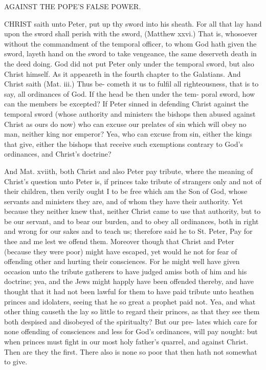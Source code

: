 \documentclass{custom}
\begin{document}
AGAINST THE POPE'S FALSE POWER. 

CHRIST saith unto Peter, put up thy sword into his sheath. 
For all that lay hand upon the sword shall perish with 
the sword, (Matthew xxvi.) That is, whosoever without the 
commandment of the temporal officer, to whom God hath 
given the sword, layeth hand on the sword to take vengeance,
the same deserveth death in the deed doing. God did 
not put Peter only under the temporal sword, but also
Christ himself. As it appeareth in the fourth chapter to
the Galatians. And Christ saith (Mat. iii.) Thus be-
cometh it us to fulfil all righteousness, that is to say, all 
ordinances of God. If the head be then under the tem- 
poral sword, how can the members be excepted? If 
Peter sinned in defending Christ against the temporal 
sword (whose authority and ministers the bishops then 
abused against Christ as ours do now) who can excuse our 
prelates of sin which will obey no man, neither king nor 
emperor? Yea, who can excuse from sin, either the kings 
that give, either the bishops that receive such exemptions 
contrary to God's ordinances, and Christ's doctrine? 

And Mat. xviith, both Christ and also Peter pay tribute, 
where the meaning of Christ's question unto Peter is, if 
princes take tribute of strangers only and not of their 
children, then verily ought I to be free which am the Son 
of God, whose servants and ministers they are, and of 
whom they have their authority. Yet because they neither 
knew that, neither Christ came to use that authority, but 
to be our servant, and to bear our burden, and to obey all 
ordinances, both in right and wrong for our sakes and to 
teach us; therefore said he to St. Peter, Pay for thee and 
me lest we offend them. Moreover though that Christ 
and Peter (because they were poor) might have escaped, 
yet would he not for fear of offending other and hurting 
their consciences. For he might well have given occasion 
unto the tribute gatherers to have judged amiss both of 
him and his doctrine; yea, and the Jews might happly 
have been offended thereby, and have thought that it had 
not been lawful for them to have paid tribute unto heathen 
princes and idolaters, seeing that he so great a prophet 
paid not. Yea, and what other thing causeth the lay 
so little to regard their princes, as that they see them both 
despised and disobeyed of the spiritualty? But our pre- 
lates which care for none offending of consciences and less
for God's ordinances, will pay nought: but when princes
must fight in our most holy father's quarrel, and against
Christ. Then are they the first. There also is none so 
poor that then hath not somewhat to give.
\end{document}
